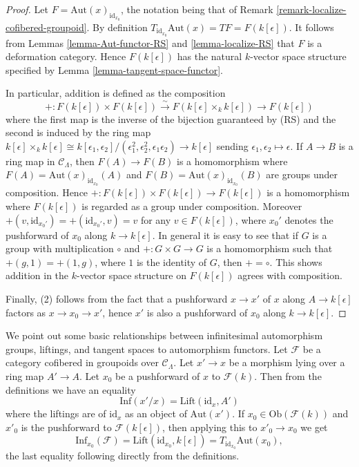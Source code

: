 \begin{proof}
Let $F = \text{Aut}(x)_{\text{id}_{x_0}}$, the notation being that 
of Remark \ref{remark-localize-cofibered-groupoid}. By definition 
$T_{\text{id}_{x_0}} \text{Aut}(x) = TF = F(k[\epsilon])$. It 
follows from Lemmas \ref{lemma-Aut-functor-RS} and \ref{lemma-localize-RS} that 
$F$ is a deformation category.  Hence $F(k[\epsilon])$ has the natural 
$k$-vector space structure specified by Lemma 
\ref{lemma-tangent-space-functor}.  

\medskip \noindent
In particular, addition is defined as the composition
\[ +: F(k[\epsilon]) \times F(k[\epsilon]) \xrightarrow{\sim} 
F(k[\epsilon] \times_{k} k[\epsilon]) \to F(k[\epsilon]) \]
where the first map is the inverse of the bijection guaranteed by (RS) and the 
second is induced by the ring map $k[\epsilon] \times_{k} k[\epsilon] 
\cong k[\epsilon_1,\epsilon_2]/(\epsilon_1^2, \epsilon_2^2, 
\epsilon_1\epsilon_2) \to k[\epsilon]$ sending 
$\epsilon_1,\epsilon_2 \mapsto \epsilon$. If $A \to B$ is a 
ring map in $\mathcal{C}_\Lambda$, then $F(A) \to F(B)$ is a 
homomorphism where $F(A) = \text{Aut}(x)_{\text{id}_{x_0}}(A)$ and 
$F(B) = \text{Aut}(x)_{\text{id}_{x_0}}(B)$ are groups under 
composition.  Hence $+: F(k[\epsilon]) \times F(k[\epsilon])\to 
F(k[\epsilon])$ is a homomorphism where $F(k[\epsilon])$ is regarded as a 
group under composition.  Moreover $+(v, \text{id}_{x_0'}) = 
+(\text{id}_{x_0'},v) = v$ for any $v \in F(k[\epsilon])$, where 
$x_0'$ denotes the pushforward of $x_0$ along $k \to k[\epsilon]$.  
In general it is easy to see that if $G$ is a group with multiplication $\circ$ 
and $+: G \times G \to G$ is a homomorphism such that $+(g,1) = 
+(1,g)$, where $1$ is the identity of $G$, then $+ = \circ$.  This shows 
addition in the $k$-vector space structure on $F(k[\epsilon])$ agrees with 
composition.

\medskip \noindent
Finally, (2) follows from the fact that a pushforward $x \to x'$ of $x$ 
along $A \to k[\epsilon]$ factors as $x \to x_0 \to 
x'$, hence $x'$ is also a pushforward of $x_0$ along $k \to 
k[\epsilon]$.
\end{proof}

\begin{remark}
\label{remark-infaut-lifting-equalities}
We point out some basic relationships between infinitesimal automorphism 
groups, liftings, and tangent spaces to automorphism functors.  Let $\mathcal 
F$ be a category cofibered in groupoids over $\mathcal{C}_\Lambda$.  Let $x' 
\to x$ be a morphism lying over a ring map $A' \to A$.  Let 
$x_0$ be a pushforward of $x$ to $\mathcal{F}(k)$.  Then from the definitions
we 
have an equality
\[ \text{Inf}(x'/x) = \text{Lift}(\text{id}_{x}, A') \]
where the liftings are of $\text{id}_{x}$ as an object of 
$\text{Aut}(x')$.  If $x_0 \in \text{Ob}(\mathcal{F}(k))$ and $x'_0$ 
is the pushforward to $\mathcal{F}(k[\epsilon])$, then applying this to $x'_0 
\to x_0$ we get 
\[ \text{Inf}_{x_0}(\mathcal{F}) = 
\text{Lift}(\text{id}_{x_0}, k[\epsilon]) = 
T_{\text{id}_{x_0}} \text{Aut}(x_0), \]
the last equality following directly from the definitions.
\end{remark}

